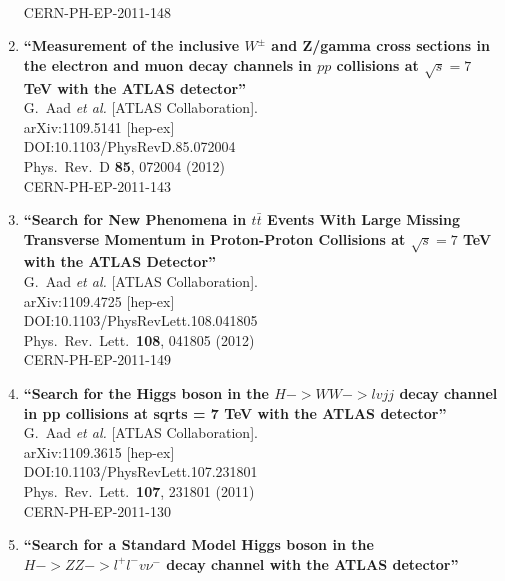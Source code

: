 \documentclass{article}
\begin{document}
\begin{enumerate}
  \\{}CERN-PH-EP-2011-148
\item%
{\bf ``Measurement of the inclusive $W^\pm$ and Z/gamma cross sections in the electron and muon decay channels in $pp$ collisions at $\sqrt{s}=7$ TeV with the ATLAS detector''}
  \\{}G.~Aad {\it et al.} [ATLAS Collaboration].
  \\{}arXiv:1109.5141 [hep-ex]
  \\{}DOI:10.1103/PhysRevD.85.072004
  \\{}Phys.\ Rev.\ D {\bf 85}, 072004 (2012)
  \\{}CERN-PH-EP-2011-143
\item%
{\bf ``Search for New Phenomena in $t\bar{t}$ Events With Large Missing Transverse Momentum in Proton-Proton Collisions at $\sqrt{s}=7$ TeV with the ATLAS Detector''}
  \\{}G.~Aad {\it et al.} [ATLAS Collaboration].
  \\{}arXiv:1109.4725 [hep-ex]
  \\{}DOI:10.1103/PhysRevLett.108.041805
  \\{}Phys.\ Rev.\ Lett.\  {\bf 108}, 041805 (2012)
  \\{}CERN-PH-EP-2011-149
\item%
{\bf ``Search for the Higgs boson in the $H -> WW -> lvjj$ decay channel in pp collisions at sqrt{s} = 7 TeV with the ATLAS detector''}
  \\{}G.~Aad {\it et al.} [ATLAS Collaboration].
  \\{}arXiv:1109.3615 [hep-ex]
  \\{}DOI:10.1103/PhysRevLett.107.231801
  \\{}Phys.\ Rev.\ Lett.\  {\bf 107}, 231801 (2011)
  \\{}CERN-PH-EP-2011-130
\item%
{\bf ``Search for a Standard Model Higgs boson in the $H -> ZZ -> l^+l^-v\nu^-$ decay channel with the ATLAS detector''}

\end{enumerate}
\end{document}
